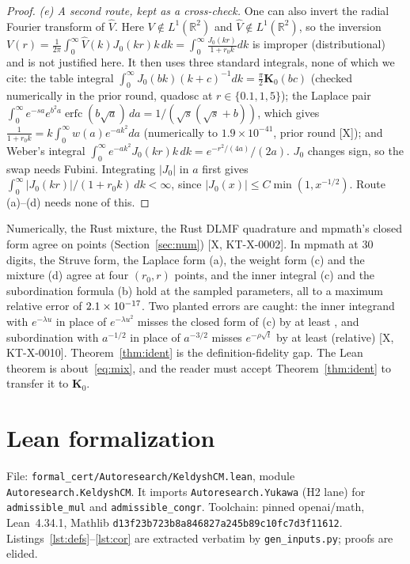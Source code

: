 \documentclass[11pt]{article}
\theoremstyle{remark}
\newcommand{\R}{\mathbb{R}}
\newcommand{\tier}[1]{\textsf{[#1]}}
\newcommand{\lean}[1]{\texttt{#1}}
\begin{document}
\begin{proof}
\emph{(e) A second route, kept as a cross-check.} One can also invert the radial Fourier transform of $\widehat V$. Here
$V\notin L^1(\R^2)$ and $\widehat V\notin L^1(\R^2)$, so the inversion
$V(r)=\frac1{2\pi}\int_0^\infty\widehat V(k)J_0(kr)k\,dk=\int_0^\infty\frac{J_0(kr)}{1+r_0k}dk$ is improper
(distributional) and is not justified here. It then uses three standard integrals, none of which we cite: the
table integral $\int_0^\infty J_0(bk)(k+c)^{-1}dk=\frac\pi2\mathbf K_0(bc)$ (checked numerically in the prior round,
quadosc at $r\in\{0.1,1,5\}$); the Laplace pair $\int_0^\infty e^{-sa}e^{b^2a}\operatorname{erfc}(b\sqrt a)\,da=
1/(\sqrt s(\sqrt s+b))$, which gives $\frac1{1+r_0k}=k\int_0^\infty w(a)e^{-ak^2}da$ (numerically to
$1.9\times10^{-41}$, prior round \tier{X}); and Weber's integral $\int_0^\infty e^{-ak^2}J_0(kr)k\,dk=e^{-r^2/(4a)}/(2a)$.
$J_0$ changes sign, so the swap needs Fubini. Integrating $|J_0|$ in $a$ first gives
$\int_0^\infty|J_0(kr)|/(1+r_0k)\,dk<\infty$, since $|J_0(x)|\le C\min(1,x^{-1/2})$. Route (a)--(d) needs none of this.
\end{proof}
Numerically, the Rust mixture, the Rust DLMF quadrature and mpmath's closed form agree on \KTVnpts{} points
(Section~\ref{sec:num}) \tier{X, KT-X-0002}. In mpmath at 30 digits, the Struve form, the Laplace form (a), the weight
form (c) and the mixture (d) agree at four $(r_0,r)$ points, and the inner integral (c) and the subordination formula
(b) hold at the sampled parameters, all to a maximum relative error of $2.1\times10^{-17}$. Two planted errors are
caught: the inner integrand with $e^{-\lambda u}$ in place of $e^{-\lambda u^2}$ misses the closed form of (c) by at
least \KTRouteENegInner{}, and subordination with $a^{-1/2}$ in place of $a^{-3/2}$ misses $e^{-\rho\sqrt t}$ by at least
\KTRouteENegSub{} (relative) \tier{X, KT-X-0010}. Theorem~\ref{thm:ident} is the definition-fidelity gap. The Lean theorem
is about~\eqref{eq:mix}, and the reader must accept Theorem~\ref{thm:ident} to transfer it to $\mathbf K_0$.

\section{Lean formalization}\label{sec:lean}
File: \texttt{formal\_cert/Autoresearch/KeldyshCM.lean}, module \texttt{Autoresearch.KeldyshCM}. It imports
\texttt{Autoresearch.Yukawa} (H2 lane) for \lean{admissible\_mul} and \lean{admissible\_congr}. Toolchain: pinned
openai/math, Lean~4.34.1, Mathlib \texttt{d13f23b723b8a846827a245b89c10fc7d3f11612}. Listings~\ref{lst:defs}--\ref{lst:cor}
are extracted verbatim by \texttt{gen\_inputs.py}; proofs are elided.
\end{document}
